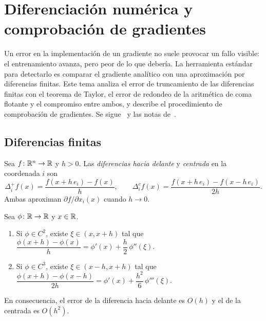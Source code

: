 \chapter{Diferenciación numérica y comprobación de gradientes}
\label{tema:6}

Un error en la implementación de un gradiente no suele provocar un fallo visible: el entrenamiento avanza, pero peor de lo que debería. La herramienta estándar para detectarlo es comparar el gradiente analítico con una aproximación por diferencias finitas. Este tema analiza el error de truncamiento de las diferencias finitas con el teorema de Taylor, el error de redondeo de la aritmética de coma flotante y el compromiso entre ambos, y describe el procedimiento de comprobación de gradientes. Se sigue~\cite[§4.1]{gbc} y las notas de~\cite{cs231n}.

\section{Diferencias finitas}

\begin{definicion}\label{def:diferencias}
Sea $f\colon\mathbb{R}^{n}\to\mathbb{R}$ y $h>0$. Las \emph{diferencias hacia delante} y \emph{centrada} en la coordenada $i$ son
\[
\Delta_i^{+}f(x)=\frac{f(x+h\,e_i)-f(x)}{h},\qquad
\Delta_i^{c}f(x)=\frac{f(x+h\,e_i)-f(x-h\,e_i)}{2h}.
\]
Ambas aproximan $\partial f/\partial x_i(x)$ cuando $h\to 0$.
\end{definicion}

\begin{proposicion}\label{prop:truncamiento}
Sea $\phi\colon\mathbb{R}\to\mathbb{R}$ y $x\in\mathbb{R}$.
\begin{enumerate}
  \item Si $\phi\in C^{2}$, existe $\xi\in(x,x+h)$ tal que $\dfrac{\phi(x+h)-\phi(x)}{h}=\phi'(x)+\dfrac{h}{2}\,\phi''(\xi)$.
  \item Si $\phi\in C^{3}$, existe $\xi\in(x-h,x+h)$ tal que $\dfrac{\phi(x+h)-\phi(x-h)}{2h}=\phi'(x)+\dfrac{h^{2}}{6}\,\phi'''(\xi)$.
\end{enumerate}
En consecuencia, el error de la diferencia hacia delante es $O(h)$ y el de la centrada es $O(h^{2})$.
\end{proposicion}

